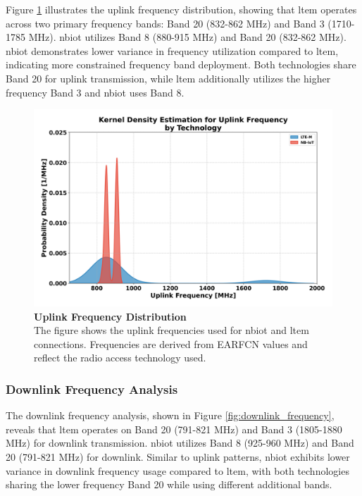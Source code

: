\documentclass[12pt, english, openany]{book}
\begin{document}
Figure \ref{fig:uplink_frequency} illustrates the uplink frequency distribution, showing that \gls{ltem} operates across two primary frequency bands: Band 20 (832-862 MHz) and Band 3 (1710-1785 MHz). \gls{nbiot} utilizes Band 8 (880-915 MHz) and Band 20 (832-862 MHz). \gls{nbiot} demonstrates lower variance in frequency utilization compared to \gls{ltem}, indicating more constrained frequency band deployment. Both technologies share Band 20 for uplink transmission, while \gls{ltem} additionally utilizes the higher frequency Band 3 and \gls{nbiot} uses Band 8.

\begin{figure}[htbp]
    \centering
    \includegraphics[width=1.0\textwidth]{uplink_frequency_frequency_kde.png}
    \caption{\textbf{Uplink Frequency Distribution} \\ The figure shows the uplink frequencies used for \gls{nbiot} and \gls{ltem} connections. Frequencies are derived from EARFCN values and reflect the radio access technology used.}
    \label{fig:uplink_frequency}
\end{figure}

\FloatBarrier
\subsubsection*{Downlink Frequency Analysis} \label{sec:downlink_frequency_analysis}
The downlink frequency analysis, shown in Figure \ref{fig:downlink_frequency}, reveals that \gls{ltem} operates on Band 20 (791-821 MHz) and Band 3 (1805-1880 MHz) for downlink transmission. \gls{nbiot} utilizes Band 8 (925-960 MHz) and Band 20 (791-821 MHz) for downlink. Similar to uplink patterns, \gls{nbiot} exhibits lower variance in downlink frequency usage compared to \gls{ltem}, with both technologies sharing the lower frequency Band 20 while using different additional bands.
\end{document}
